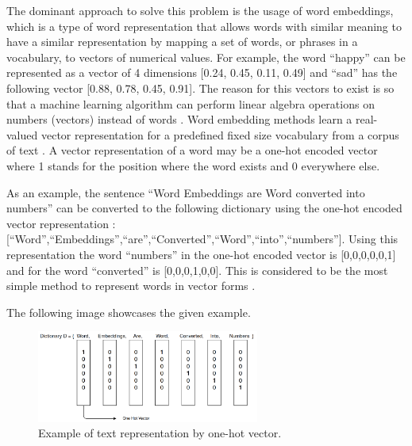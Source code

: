     \par The dominant approach to solve this problem is the usage of word embeddings, which is a type of word representation that allows words with similar meaning to have a similar representation by mapping a set of words, or phrases in a vocabulary, to vectors of numerical values. For example, the word “happy” can be represented as a vector of 4 dimensions [0.24, 0.45, 0.11, 0.49] and “sad” has the following vector [0.88, 0.78, 0.45, 0.91]. The reason for this vectors to exist is so that a machine learning algorithm can perform linear algebra operations on numbers (vectors) instead of words \cite{MuratMustafa}. Word embedding methods learn a real-valued vector representation for a predefined fixed size vocabulary from a corpus  of text \cite{Brownlee2017}. A vector representation of a word may be a one-hot encoded vector where 1 stands for the position where the word exists and 0 everywhere else. 
    
    \par As an example, the sentence ``Word Embeddings are Word converted into numbers” can be converted to the following dictionary using the one-hot encoded vector representation : [``Word”,``Embeddings”,``are”,``Converted”,``Word”,``into”,``numbers”]. Using this representation the word ``numbers” in the one-hot encoded vector is [0,0,0,0,0,1] and for the word ``converted” is [0,0,0,1,0,0]. This is considered to be the most simple method to represent words in vector forms \cite{Vidhya2017}.

    \par The following image showcases the given example.
    
    
    \begin{figure}[H]
        \centering
        \captionsetup{justification=centering}
        \includegraphics[width=0.65\textwidth]{Sections/3StateOfTheArt/3_images/one_hot_encoding.png}
        \caption{Example of text representation by one-hot vector.}   
    \end{figure}
    
    
    



